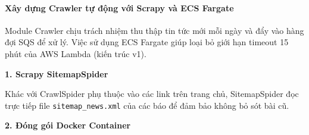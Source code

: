\hypertarget{xuxe2y-dux1ef1ng-crawler-tux1ef1-ux111ux1ed9ng-vux1edbi-scrapy-vuxe0-ecs-fargate}{%
\paragraph{Xây dựng Crawler tự động với Scrapy và ECS
Fargate}}

Module Crawler chịu trách nhiệm thu thập tin tức mới mỗi ngày và đẩy vào
hàng đợi SQS để xử lý. Việc sử dụng ECS Fargate giúp loại bỏ giới hạn
timeout 15 phút của AWS Lambda (kiến trúc v1).

\textbf{1. Scrapy SitemapSpider}

Khác với CrawlSpider phụ thuộc vào các link trên trang chủ,
SitemapSpider đọc trực tiếp file \texttt{sitemap\_news.xml} của các báo
để đảm bảo không bỏ sót bài cũ.

\begin{Shaded}
\begin{Highlighting}[]

\OperatorTok{=} 
    
        
\OperatorTok{=}

\end{Highlighting}
\end{Shaded}

\textbf{2. Đóng gói Docker Container}

